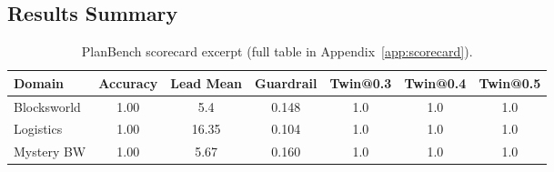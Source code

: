 \documentclass[11pt]{article}
\begin{document}
\subsection{Results Summary}
\begin{table}[h]
  \centering
  \caption{PlanBench scorecard excerpt (full table in Appendix~\ref{app:scorecard}).}
  \label{tab:planbench-scorecard}
  \begin{tabular}{lcccccc}
    \toprule
    Domain & Accuracy & Lead Mean & Guardrail & Twin@0.3 & Twin@0.4 & Twin@0.5 \\
    \midrule
    Blocksworld & 1.00 & 5.4 & 0.148 & 1.0 & 1.0 & 1.0 \\
    Logistics & 1.00 & 16.35 & 0.104 & 1.0 & 1.0 & 1.0 \\
    Mystery BW & 1.00 & 5.67 & 0.160 & 1.0 & 1.0 & 1.0 \\
    \bottomrule
  \end{tabular}
\end{table}
\end{document}
